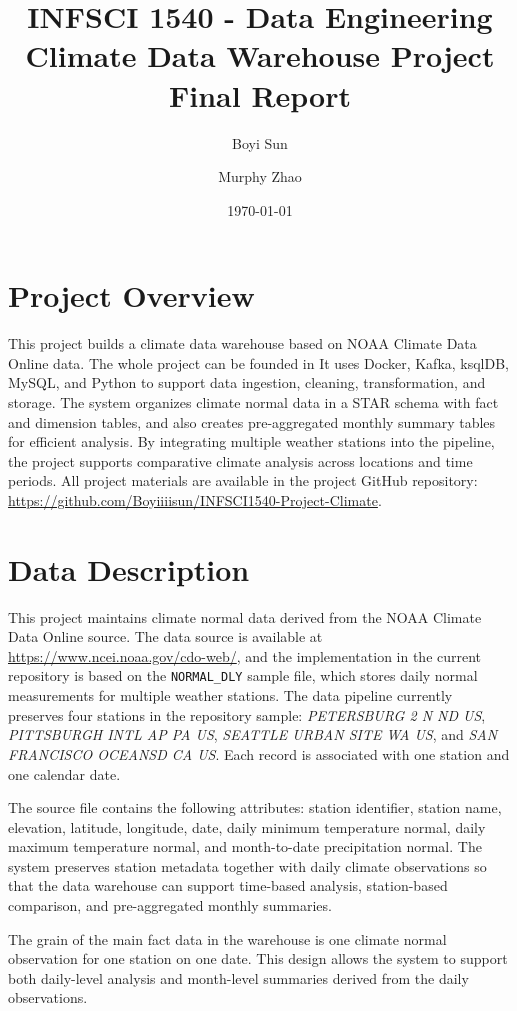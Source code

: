 \documentclass[11pt]{article}
\title{INFSCI 1540 - Data Engineering\\Climate Data Warehouse Project\\\large Final Report}
\author{Boyi Sun \and Murphy Zhao}
\date{\today}
\begin{document}
\maketitle
\onehalfspacing

\section{Project Overview}
This project builds a climate data warehouse based on NOAA Climate Data Online data. The whole project can be founded in It uses Docker, Kafka, ksqlDB, MySQL, and Python to support data ingestion, cleaning, transformation, and storage. The system organizes climate normal data in a STAR schema with fact and dimension tables, and also creates pre-aggregated monthly summary tables for efficient analysis. By integrating multiple weather stations into the pipeline, the project supports comparative climate analysis across locations and time periods. All project materials are available in the project GitHub repository: \href{https://github.com/Boyiiiisun/INFSCI1540-Project-Climate}{https://github.com/Boyiiiisun/INFSCI1540-Project-Climate}.


\section{Data Description}
This project maintains climate normal data derived from the NOAA Climate Data Online source. The data source is available at \href{https://www.ncei.noaa.gov/cdo-web/}{https://www.ncei.noaa.gov/cdo-web/}, and the implementation in the current repository is based on the \texttt{NORMAL\_DLY} sample file, which stores daily normal measurements for multiple weather stations. The data pipeline currently preserves four stations in the repository sample: \textit{PETERSBURG 2 N ND US}, \textit{PITTSBURGH INTL AP PA US}, \textit{SEATTLE URBAN SITE WA US}, and \textit{SAN FRANCISCO OCEANSD CA US}. Each record is associated with one station and one calendar date.

The source file contains the following attributes: station identifier, station name, elevation, latitude, longitude, date, daily minimum temperature normal, daily maximum temperature normal, and month-to-date precipitation normal. The system preserves station metadata together with daily climate observations so that the data warehouse can support time-based analysis, station-based comparison, and pre-aggregated monthly summaries.

The grain of the main fact data in the warehouse is one climate normal observation for one station on one date. This design allows the system to support both daily-level analysis and month-level summaries derived from the daily observations.
\end{document}
